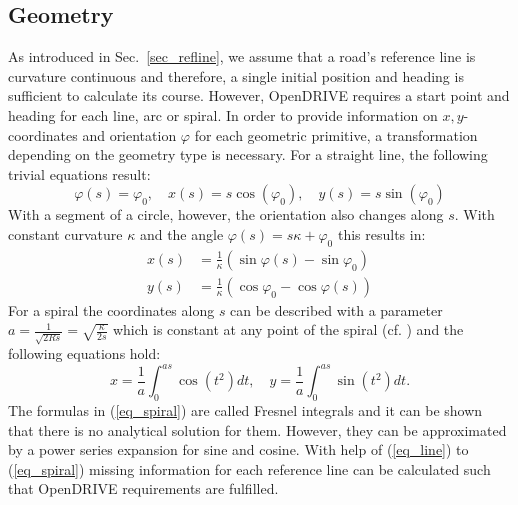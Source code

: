 \documentclass[a4paper, 10pt, conference]{ieeeconf}      %
\begin{document}
\subsection{Geometry}\label{sec_geometry}
	As introduced in Sec.~\ref{sec_refline}, we assume that a road's reference line is curvature continuous and therefore, a single initial position and heading is sufficient to calculate its course. However, OpenDRIVE requires a start point and heading for each line, arc or spiral. In order to provide information on $x,y$-coordinates and orientation $\varphi$ for each geometric primitive, a transformation depending on the geometry type is necessary. For a straight line, the following trivial equations result:
    \begin{equation}
        \varphi(s) = \varphi_0, \quad x(s) = s \cos(\varphi_0), \quad y(s) = s \sin(\varphi_0) %
        \label{eq_line}
    \end{equation}
    With a segment of a circle, however, the orientation also changes along $s$. With constant curvature $\kappa$ and the angle $\varphi(s) = s \kappa + \varphi_0$ this results in:
    \begin{equation}
    \begin{split}
        x(s) &= \frac{1}{\kappa} \left(\sin\varphi(s) - \sin\varphi_0 \right)\\
        y(s) &= \frac{1}{\kappa} \left(\cos\varphi_0 - \cos\varphi(s) \right) %
    \end{split}
    \label{eq_arc}
    \end{equation}
    For a spiral the coordinates along $s$ can be described with a parameter \(a = \frac{1}{\sqrt{2Rs}} = \sqrt{\frac{\kappa}{2s}}\) which is constant at any point of the spiral (cf. \cite{Baier.2008}) and the following equations hold: 
    \begin{equation} 
        x = \frac{1}{a}\int_0^{as}  \cos\left(t^2\right)dt, \quad y = \frac{1}{a}\int_0^{as}  \sin\left(t^2\right)dt \text{.}
        \label{eq_spiral}
    \end{equation}
	The formulas in (\ref{eq_spiral}) are called Fresnel integrals and it can be shown that there is no analytical solution for them. However, they can be approximated by a power series expansion for sine and cosine. With help of (\ref{eq_line}) to (\ref{eq_spiral}) missing information for each reference line can be calculated such that OpenDRIVE requirements are fulfilled.
\end{document}
